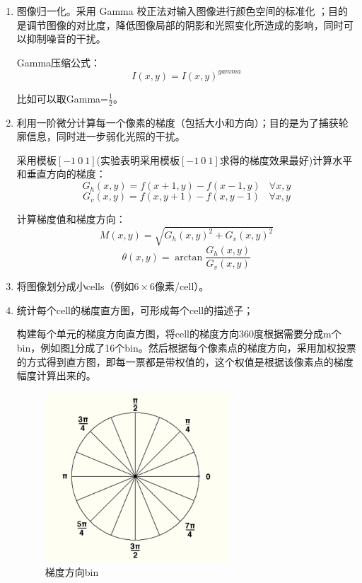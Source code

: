 \documentclass[12pt]{article}
\begin{document}
\begin{enumerate}
\item 图像归一化。采用 Gamma 校正法对输入图像进行颜色空间的标准化 ；目的是调节图像的对比度，降低图像局部的阴影和光照变化所造成的影响，同时可以抑制噪音的干扰。

Gamma压缩公式：
\begin{displaymath}
    I(x,y)=I(x,y)^{gamma}
\end{displaymath}

比如可以取Gamma=$\frac{1}{2}$。

\item 利用一阶微分计算每一个像素的梯度（包括大小和方向）；目的是为了捕获轮廓信息，同时进一步弱化光照的干扰。
    
    采用模板$[-1~0~1]$(实验表明采用模板$[-1~0~1]$求得的梯度效果最好)计算水平和垂直方向的梯度：
        \begin{displaymath}
        G_{h}(x,y)=f(x+1,y)-f(x-1,y)~~~~\forall x,y
        \end{displaymath}
        \begin{displaymath}
        G_{v}(x,y)=f(x,y+1)-f(x,y-1)~~~~\forall x,y
        \end{displaymath}
        
        计算梯度值和梯度方向：
        \begin{displaymath}
        M(x,y)=\sqrt{G_{h}(x,y)^{2}+G_{v}(x,y)^2}
        \end{displaymath}
        \begin{displaymath}
        \theta(x,y)=\arctan\frac{G_{h}(x,y)}{G_{v}(x,y)}
        \end{displaymath}
        
\item 将图像划分成小cells（例如$6 \times 6$像素/cell）。

\item 统计每个cell的梯度直方图，可形成每个cell的描述子；
        
        构建每个单元的梯度方向直方图，将cell的梯度方向360度根据需要分成m个bin，例如图\ref{fig:bin}分成了16个bin。然后根据每个像素点的梯度方向，采用加权投票的方式得到直方图，即每一票都是带权值的，这个权值是根据该像素点的梯度幅度计算出来的。
        \begin{figure}
            \centering
            \includegraphics[width=0.3\linewidth]{bin}
            \caption{梯度方向bin}
            \label{fig:bin}
        \end{figure}
       

\end{enumerate}
\end{document}
